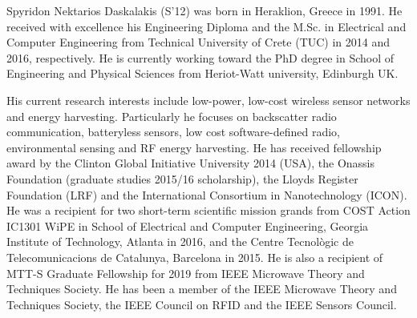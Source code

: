 \documentclass[journal]{IEEEtran}
\begin{document}
\begin{IEEEbiography}
{Spyridon Nektarios Daskalakis} (S'12) was born in Heraklion, Greece in 1991. He received with excellence his Engineering Diploma and the M.Sc. in Electrical and Computer Engineering from Technical University of Crete (TUC) in 2014 and 2016, respectively. He is currently working toward the PhD degree in School of Engineering and Physical Sciences from Heriot-Watt university, Edinburgh UK. 

His current research interests include low-power, low-cost wireless sensor networks and energy harvesting. Particularly he focuses on backscatter radio communication, batteryless sensors, low cost software-defined radio, environmental sensing and RF energy harvesting. 
He has received fellowship award by the Clinton Global Initiative University 2014 (USA), the Onassis Foundation (graduate studies 2015/16 scholarship), the Lloyds Register Foundation (LRF) and the International Consortium in Nanotechnology (ICON). He was a recipient for two short-term scientific mission grands from COST Action IC1301 WiPE in School of Electrical and Computer Engineering, Georgia Institute of Technology, Atlanta in 2016, and the Centre Tecnològic de Telecomunicacions de Catalunya, Barcelona in 2015. 
He  is also a recipient  of MTT-S Graduate Fellowship for 2019 from IEEE Microwave Theory and Techniques Society.
He has been a member of the IEEE Microwave Theory and Techniques Society, the IEEE Council on RFID and the IEEE Sensors Council.
\end{IEEEbiography}
\end{document}
